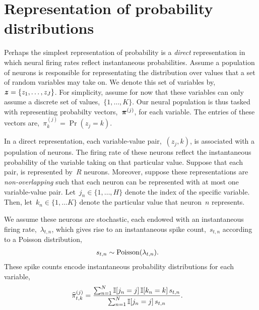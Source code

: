 \section{Representation of probability distributions}

\sloppy
Perhaps the simplest representation of probability is a \emph{direct}
representation in which neural firing rates reflect instantaneous
probabilities. Assume a population of neurons is responsible for
representating the distribution over values that a set of random
variables may take on. We denote this set of variables 
by,~${\boldsymbol{z} = \{z_1, \ldots, z_J\}}$.  For
simplicity, assume for now that these variables can only assume a
discrete set of values,~${\{1, \ldots, K\}}$.   Our
neural population is thus tasked with representing probabilty
vectors,~$\boldsymbol{\pi}^{(j)}$, for each 
variable. The entries of these vectors are,~${\pi^{(j)}_k = \Pr(z_j=k)}$.

In a direct representation, each variable-value pair,~$(z_j,k)$, is associated with a population of neurons. The firing
rate of these neurons reflect the instantaneous probability of the
variable taking on that particular value.  Suppose that each
pair, is represented by~$R$ neurons. Moreover, suppose
these representations are \emph{non-overlapping} such that each neuron
can be represented with at most one variable-value pair.
Let~${j_n \in \{1, \ldots, H\}}$
denote the index of the specific variable.
Then, let~$k_n \in \{1, \ldots K\}$ denote the particular value that neuron~$n$ represents.

We assume these neurons are stochastic, each endowed
with an instantaneous firing rate,~$\lambda_{t,n}$, which gives rise to an
instantaneous spike count,~$s_{t,n}$ according to a Poisson distribution,
\begin{align}
s_{t,n} &\sim \mathrm{Poisson}(\lambda_{t,n}).
\end{align}
These spike counts encode
instantaneous probability distributions for each variable,
\begin{align}
  \widehat{\pi}_{t,k}^{(j)} &=
  \frac{\sum_{n=1}^N \mathbb{I}[j_n=j] \, \mathbb{I}[k_n=k] \, s_{t,n}}
       {\sum_{n=1}^N \mathbb{I}[j_n=j] \, s_{t,n}}.
\end{align}

